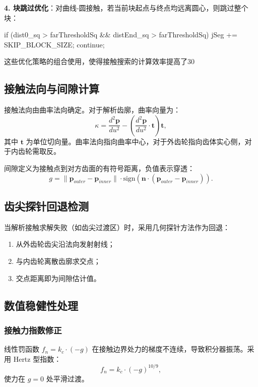 \documentclass[12pt]{ctexart}
\begin{document}
\textbf{4. 块跳过优化}：对曲线-圆接触，若当前块起点与终点均远离圆心，则跳过整个块：

\begin{cppcode}[块跳过策略]
if (dist0_sq > farThresholdSq && distEnd_sq > farThresholdSq) {
    jSeg += SKIP_BLOCK_SIZE;
    continue;
}
\end{cppcode}

这些优化策略的组合使用，使得接触搜索的计算效率提高了30%

\subsection{接触法向与间隙计算}

接触法向由曲率法向确定。对于解析齿廓，曲率向量为：
\begin{equation}
\kappa = \frac{d^2\mathbf{p}}{du^2} - \left(\frac{d^2\mathbf{p}}{du^2} \cdot \mathbf{t}\right)\mathbf{t},
\end{equation}
其中 $\mathbf{t}$ 为单位切向量。曲率法向指向曲率中心，对于外齿轮指向齿体实心侧，对于内齿轮需取反。

间隙定义为接触点到对方齿面的有符号距离，负值表示穿透：
\begin{equation}
g = \|\mathbf{p}_{outer} - \mathbf{p}_{inner}\| \cdot \text{sign}(\mathbf{n} \cdot (\mathbf{p}_{outer} - \mathbf{p}_{inner})).
\end{equation}

\subsection{齿尖探针回退检测}

当解析接触求解失败（如齿尖过渡区）时，采用几何探针方法作为回退：
\begin{enumerate}
  \item 从外齿轮齿尖沿法向发射射线；
  \item 与内齿轮离散齿廓求交点；
  \item 交点距离即为间隙估计值。
\end{enumerate}

\subsection{数值稳健性处理}

\subsubsection{接触力指数修正}
线性罚函数 $f_n = k_c \cdot (-g)$ 在接触边界处力的梯度不连续，导致积分器振荡。采用 Hertz 型指数：
\begin{equation}
f_n = k_c \cdot (-g)^{10/9},
\end{equation}
使力在 $g=0$ 处平滑过渡。
\end{document}
